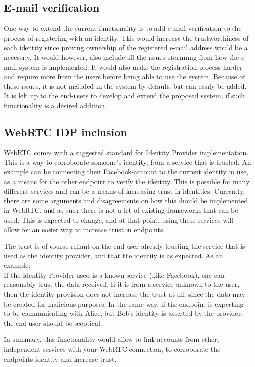 	\subsection{E-mail verification}
	One way to extend the current functionality is to add e-mail verification to the process of registering with an identity. This would increase the trustworthiness of each identity since proving ownership of the registered e-mail address would be a necessity. It would however, also include all the issues stemming from how the e-mail system is implemented. It would also make the registration process harder and require more from the users before being able to use the system. Because of these issues, it is not included in the system by default, but can easily be added. It is left up to the end-users to develop and extend the proposed system, if such functionality is a desired addition.

	\subsection{WebRTC IDP inclusion}
	WebRTC comes with a suggested standard for Identity Provider implementation. This is a way to corroborate someone's identity, from a service that is trusted. An example can be connecting their Facebook-account to the current identity in use, as a means for the other endpoint to verify the identity. This is possible for many different services and can be a means of increasing trust in identities. Currently, there are some arguments and disagreements on how this should be implemented in WebRTC, and as such there is not a lot of existing frameworks that can be used. This is expected to change, and at that point, using these services will allow for an easier way to increase trust in endpoints.

	The trust is of course reliant on the end-user already trusting the service that is used as the identity provider, and that the identity is as expected. As an example:\\
	If the Identity Provider used is a known service (Like Facebook), one can reasonably trust the data received. If it is from a service unknown to the user, then the identity provision does not increase the trust at all, since the data may be created for malicious purposes. In the same way, if the endpoint is expecting to be communicating with Alice, but Bob's identity is asserted by the provider, the end user should be sceptical.

	In summary, this functionality would allow to link accounts from other, independent services with your WebRTC connection, to corroborate the endpoints identity and increase trust.

